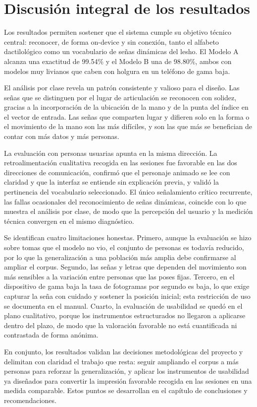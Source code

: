 \section{Discusión integral de los resultados}

Los resultados permiten sostener que el sistema cumple su objetivo técnico central: reconocer, de forma on-device y sin conexión, tanto el alfabeto dactilológico como un vocabulario de señas dinámicas del \Acrshort{lesho}. El Modelo A alcanza una exactitud de 99.54\% y el Modelo B una de 98.80\%, ambos con modelos muy livianos que caben con holgura en un teléfono de gama baja.

El análisis por clase revela un patrón consistente y valioso para el diseño. Las señas que se distinguen por el lugar de articulación se reconocen con solidez, gracias a la incorporación de la ubicación de la mano y de la punta del índice en el vector de entrada. Las señas que comparten lugar y difieren solo en la forma o el movimiento de la mano son las más difíciles, y son las que más se benefician de contar con más datos y más personas.

La evaluación con personas usuarias apunta en la misma dirección. La retroalimentación cualitativa recogida en las sesiones fue favorable en las dos direcciones de comunicación, confirmó que el personaje animado se lee con claridad y que la interfaz se entiende sin explicación previa, y validó la pertinencia del vocabulario seleccionado. El único señalamiento crítico recurrente, las fallas ocasionales del reconocimiento de señas dinámicas, coincide con lo que muestra el análisis por clase, de modo que la percepción del usuario y la medición técnica convergen en el mismo diagnóstico.

Se identifican cuatro limitaciones honestas. Primero, aunque la evaluación se hizo sobre tomas que el modelo no vio, el conjunto de personas es todavía reducido, por lo que la generalización a una población más amplia debe confirmarse al ampliar el corpus. Segundo, las señas y letras que dependen del movimiento son más sensibles a la variación entre personas que las poses fijas. Tercero, en el dispositivo de gama baja la tasa de fotogramas por segundo es baja, lo que exige capturar la seña con cuidado y sostener la posición inicial; esta restricción de uso se documenta en el manual. Cuarto, la evaluación de usabilidad se quedó en el plano cualitativo, porque los instrumentos estructurados no llegaron a aplicarse dentro del plazo, de modo que la valoración favorable no está cuantificada ni contrastada de forma anónima.

En conjunto, los resultados validan las decisiones metodológicas del proyecto y delimitan con claridad el trabajo que resta: seguir ampliando el corpus a más personas para reforzar la generalización, y aplicar los instrumentos de usabilidad ya diseñados para convertir la impresión favorable recogida en las sesiones en una medida comparable. Estos puntos se desarrollan en el capítulo de conclusiones y recomendaciones.
